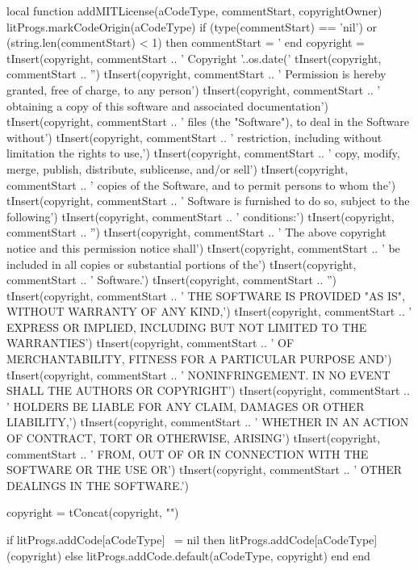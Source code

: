 local function addMITLicense(aCodeType, commentStart, copyrightOwner)
  litProgs.markCodeOrigin(aCodeType)
  if (type(commentStart) == 'nil') or (string.len(commentStart) < 1) then
    commentStart = '%
  end
  copyright = { }
  tInsert(copyright, commentStart ..
    ' Copyright '..os.date('%
  tInsert(copyright,  commentStart .. 
    '')
  tInsert(copyright, commentStart ..
    ' Permission is hereby granted, free of charge, to any person')
  tInsert(copyright, commentStart ..
    ' obtaining a copy of this software and associated documentation')
  tInsert(copyright, commentStart ..
    ' files (the "Software"), to deal in the Software without')
  tInsert(copyright, commentStart ..
    ' restriction, including without limitation the rights to use,')
  tInsert(copyright, commentStart ..
    ' copy, modify, merge, publish, distribute, sublicense, and/or sell')
  tInsert(copyright, commentStart ..
    ' copies of the Software, and to permit persons to whom the')
  tInsert(copyright, commentStart ..
    ' Software is furnished to do so, subject to the following')
  tInsert(copyright, commentStart ..
    ' conditions:')
  tInsert(copyright, commentStart ..
    '')
  tInsert(copyright, commentStart ..
    '    The above copyright notice and this permission notice shall')
  tInsert(copyright, commentStart ..
    '    be included in all copies or substantial portions of the')
  tInsert(copyright, commentStart ..
    '    Software.')
  tInsert(copyright, commentStart ..
    '')
  tInsert(copyright, commentStart ..
    ' THE SOFTWARE IS PROVIDED "AS IS", WITHOUT WARRANTY OF ANY KIND,')
  tInsert(copyright, commentStart ..
    ' EXPRESS OR IMPLIED, INCLUDING BUT NOT LIMITED TO THE WARRANTIES')
  tInsert(copyright, commentStart ..
    ' OF MERCHANTABILITY, FITNESS FOR A PARTICULAR PURPOSE AND')
  tInsert(copyright, commentStart ..
    ' NONINFRINGEMENT. IN NO EVENT SHALL THE AUTHORS OR COPYRIGHT')
  tInsert(copyright, commentStart ..
    ' HOLDERS BE LIABLE FOR ANY CLAIM, DAMAGES OR OTHER LIABILITY,')
  tInsert(copyright, commentStart ..
    ' WHETHER IN AN ACTION OF CONTRACT, TORT OR OTHERWISE, ARISING')
  tInsert(copyright, commentStart ..
    ' FROM, OUT OF OR IN CONNECTION WITH THE SOFTWARE OR THE USE OR')
  tInsert(copyright, commentStart ..
    ' OTHER DEALINGS IN THE SOFTWARE.')

  copyright = tConcat(copyright, "\n")

  if litProgs.addCode[aCodeType] ~= nil then
    litProgs.addCode[aCodeType](copyright)
  else
    litProgs.addCode.default(aCodeType, copyright)
  end
end

